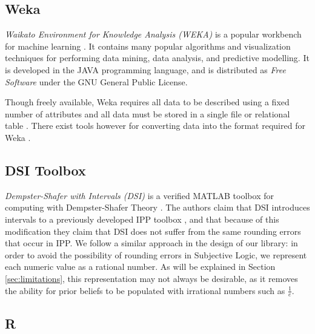 \documentclass[thesis.tex]{subfiles}
\begin{document}
\subsection{Weka}

\emph{Waikato Environment for Knowledge Analysis (WEKA)} is a popular workbench for machine learning
\cite{witten2005data}. It contains many popular algorithms and visualization techniques for performing data mining,
data analysis, and predictive modelling. It is developed in the JAVA programming language, and is
distributed as \emph{Free Software} under the GNU General Public License.

Though freely available, Weka requires all data to be described using a fixed number of attributes and all
data must be stored in a single file or relational table \cite{reutemann2005toolbox}. There exist tools however for converting data into
the format required for Weka \cite{reutemann2005toolbox}.





\subsection{DSI Toolbox}

\emph{Dempster-Shafer with Intervals (DSI)} is a verified MATLAB toolbox
for computing with Dempster-Shafer Theory \cite{auer2010verified}. The authors
claim that DSI introduces intervals to a previously developed IPP toolbox \cite{limbourg2007}, and that because of this
modification they claim that DSI does not suffer from the same rounding errors that occur in IPP.
We follow a similar approach in the design of our library: in order to avoid the possibility of rounding errors in Subjective Logic,
we represent each numeric value as a rational number. As will be explained in Section \ref{sec:limitations},
this representation may not always be desirable, as it removes the ability for prior beliefs to be populated
with irrational numbers such as $\frac{1}{e}$.








\subsection{R}
\end{document}
